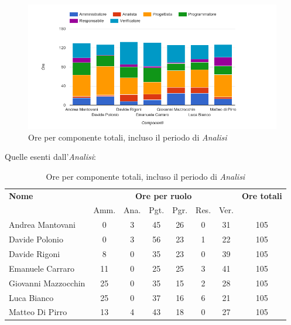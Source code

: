     \begin{figure}[H]
      \begin{center}
        \includegraphics[width=15cm]{res/img/suddivisioneRuoloProspettoOrario/orePerComponenteTotaliConAnalisi.png}
      \caption{Ore per componente totali, incluso il periodo di \textit{Analisi}}
      \end{center} 
    \end{figure}    
    

Quelle esenti dall'\textit{Analisi}:

\begin{table}[H]
\begin{tabular}{lccccccc}
\toprule
    \textbf{Nome}  & \multicolumn{6}{c}{\textbf{Ore per ruolo}} & \textbf{Ore totali} \\
     & Amm. & Ana. & Pgt. & Pgr. & Res. & Ver. & \\
    \midrule
   
	   Andrea Mantovani & 0 & 3 & 45 & 26 & 0 & 31 & 105 \\
	     Davide Polonio & 0 & 3 & 56 & 23 & 1 & 22 & 105 \\
	      Davide Rigoni & 8 & 0 & 35 & 23 & 0 & 39 & 105 \\
	   Emanuele Carraro & 11 & 0 & 25 & 25 & 3 & 41 & 105 \\
	Giovanni Mazzocchin & 25 & 0 & 35 & 15 & 2 & 28 & 105 \\
	        Luca Bianco & 25 & 0 & 37 & 16 & 6 & 21 & 105 \\
	    Matteo Di Pirro & 13 & 4 & 43 & 18 & 0 & 27 & 105 \\
   
    \bottomrule
\end{tabular}
\caption{Ore per componente totali, incluso il periodo di \textit{Analisi}}
\end{table}

